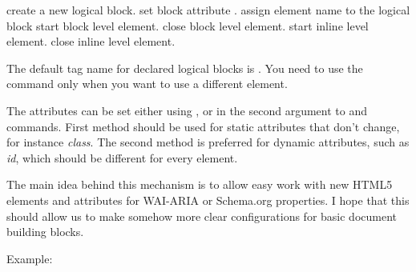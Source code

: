 create a new logical block.
 set block attribute .
 assign element name to the logical block
 start block level element.
 close block level element.
 start inline level element.
 close inline level element.


The default tag name for declared logical blocks is . You
need to use the  command only when you want to use a different
element.

The attributes can be set either using , or in the second
argument to   and  commands. First method should be
used for static attributes that don't change, for instance \textit{class}. The second method
is preferred for dynamic attributes, such as \textit{id}, which should be different for 
every element.

The main idea behind this mechanism is to allow easy work with new HTML5
elements and attributes for WAI-ARIA or Schema.org properties. I hope that
this should allow us to make somehow more clear configurations for basic
document building blocks.

Example:


\begin{texsource}



{\NoFonts{}}
{\EndNoFonts}

{}
{\NoFonts{}}
{\EndNoFonts}
\end{texsource}







